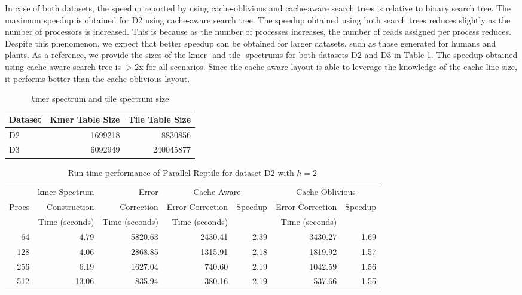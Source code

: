 \documentclass[10pt, conference]{IEEEtran}
\begin{document}
In case of both datasets, the speedup reported by using cache-oblivious and cache-aware search trees is relative to binary search tree. The maximum speedup is obtained for D2 using cache-aware search tree. The speedup obtained using both search trees reduces slightly as the number of processors is increased. This is because as the number of processes increases, the number of reads assigned per process reduces. Despite this phenomenon, we expect that better speedup can be obtained for larger datasets, such as those generated for humans and plants. As a reference, we provide the sizes of the kmer- and tile- spectrums for both datasets D2 and D3 in Table \ref{tab:spectrum}. The speedup obtained using cache-aware search tree is $>2$x for all scenarios. Since the cache-aware layout is able to leverage the knowledge of the cache line size, it performs better than the cache-oblivious layout.

\begin{table}[htb]
\caption{\label{tab:spectrum}$k$mer spectrum and tile spectrum size}
\centering
\begin{tabular}{lrr}
\hline
Dataset & Kmer Table Size & Tile Table Size\\
\hline
D2 & 1699218 & 8830856\\
D3 & 6092949 & 240045877\\
\hline
\end{tabular}
\end{table}

\begin{table*}[ht]
\normalsize
\renewcommand{\arraystretch}{1.3}
\caption{Run-time performance of Parallel Reptile for dataset D2 with $h=2$}
\label{d2h2results}
\centering
\begin{tabular}{r|r|r|rr|rr}
\hline
        & kmer-Spectrum      & Error          & \multicolumn{2}{c|}{Cache Aware} & \multicolumn{2}{c}{Cache Oblivious}  \\
\cline{4-7}
Procs   & Construction    & Correction     & Error Correction & Speedup & Error Correction & Speedup \\
        & Time (seconds)  & Time (seconds) & Time (seconds)   &         & Time (seconds)   &         \\
\hline
64  & 4.79  & 5820.63 & 2430.41 & 2.39 & 3430.27 & 1.69 \\
128 & 4.06  & 2868.85 & 1315.91 & 2.18 & 1819.92 & 1.57 \\
256 & 6.19  & 1627.04 & 740.60  & 2.19 & 1042.59 & 1.56 \\
512 & 13.06 & 835.94  & 380.16  & 2.19 & 537.66  & 1.55 \\
\hline
\end{tabular}
\end{table*}
\end{document}
